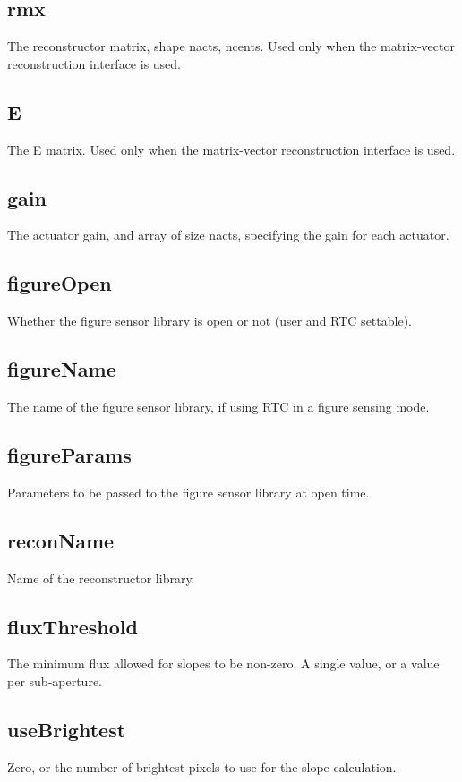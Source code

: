 \documentclass[a4,10pt]{article}
\begin{document}
\subsection{rmx}
The reconstructor matrix, shape nacts, ncents.  Used only when the
matrix-vector reconstruction interface is used.

\subsection{E}
The E matrix.  Used only when the
matrix-vector reconstruction interface is used.

\subsection{gain}
The actuator gain, and array of size nacts, specifying the gain for
each actuator.  


\subsection{figureOpen}
Whether the figure sensor library is open or not (user and RTC
settable).

\subsection{figureName}
The name of the figure sensor library, if using RTC in a figure
sensing mode.

\subsection{figureParams}
Parameters to be passed to the figure sensor library at open time.

\subsection{reconName}
Name of the reconstructor library.

\subsection{fluxThreshold}
The minimum flux allowed for slopes to be non-zero.  A single value,
or a value per sub-aperture.

\subsection{useBrightest}
Zero, or the number of brightest pixels to use for the slope
calculation.
\end{document}
